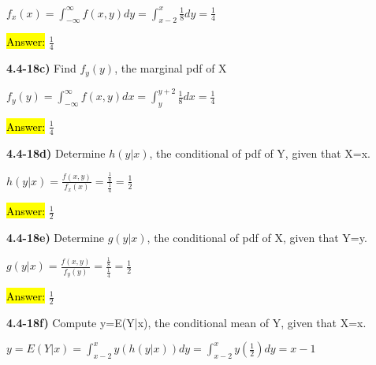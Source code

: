 \documentclass{article}
\begin{document}
$f_{x}(x)= \int_{-\infty}^{\infty} f(x,y)dy=\int_{x-2}^{x} \frac{1}{8}dy=\frac{1}{4}$

\vspace{2mm}

\hl{Answer:} $\frac{1}{4}$


\vspace{4mm}


\textbf{ 4.4-18c)} Find $f_{y}(y)$, the marginal pdf of X

\vspace{2mm}

$f_{y}(y)= \int_{-\infty}^{\infty} f(x,y)dx=\int_{y}^{y+2} \frac{1}{8}dx=\frac{1}{4}$

\vspace{2mm}

\hl{Answer:} $\frac{1}{4}$


\vspace{4mm}

\textbf{ 4.4-18d)} Determine $h(y | x)$, the conditional of pdf of Y, given that X=x.

\vspace{2mm}


$h(y | x)=\frac{f(x,y)}{f_{x}(x)}=\frac{\frac{1}{8}}{\frac{1}{4}}=\frac{1}{2}$

\vspace{2mm}

\hl{Answer:} $\frac{1}{2}$



\vspace{4mm}

\textbf{ 4.4-18e)} Determine $g(y | x)$, the conditional of pdf of X, given that Y=y.

\vspace{2mm}

$g(y | x)=\frac{f(x,y)}{f_{y}(y)}=\frac{\frac{1}{8}}{\frac{1}{4}}=\frac{1}{2}$

\vspace{2mm}

\hl{Answer:} $\frac{1}{2}$

\vspace{4mm}

\textbf{ 4.4-18f)} Compute y=E(Y|x), the conditional mean of Y, given that X=x.

\vspace{2mm}

$y=E(Y|x)=\int_{x-2}^{x} y(h(y | x)) dy=\int_{x-2}^{x} y(\frac{1}{2})dy=x-1$

\vspace{2mm}
\end{document}

